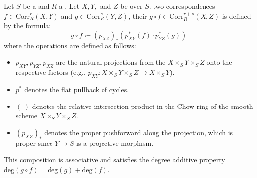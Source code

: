 \begin{definition} \label{definition:composition_of_corrs_of_relative_chow_motives_over_a_noetherian_base_with_coefficients_in_a_comm_ring}
Let $S$ be a  and $R$ a . Let $X, Y,$ and $Z$ be   over $S$.  two correspondences $f \in \mathrm{Corr}_R^r(X, Y)$ and $g \in \mathrm{Corr}_R^s(Y, Z)$, their  $g \circ f \in \mathrm{Corr}_R^{r+s}(X, Z)$ is defined by the formula:
\[ g \circ f \coloneqq (p_{XZ})_* \left( p_{XY}^*(f) \cdot p_{YZ}^*(g) \right) \]
where the operations are defined as follows:
\begin{itemize}
    \item $p_{XY}, p_{YZ}, p_{XZ}$ are the natural projections from the  $X \times_S Y \times_S Z$ onto the respective factors (e.g., $p_{XY}: X \times_S Y \times_S Z \to X \times_S Y$).
    \item $p^*$ denotes the flat pullback of cycles.
    \item $(\cdot)$ denotes the relative intersection product in the Chow ring of the smooth scheme $X \times_S Y \times_S Z$.
    \item $(p_{XZ})_*$ denotes the proper pushforward along the projection, which is proper since $Y \to S$ is a projective morphism.
\end{itemize}
This composition is associative and satisfies the degree additive property $\mathrm{deg}(g \circ f) = \mathrm{deg}(g) + \mathrm{deg}(f)$.
\end{definition}